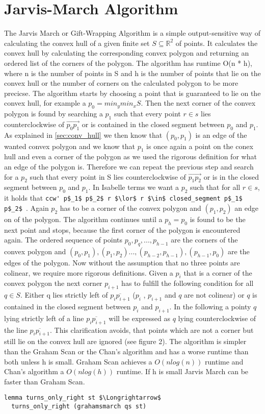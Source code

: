 \section{Jarvis-March Algorithm}
The Jarvis March or Gift-Wrapping Algorithm is a simple output-sensitive way of calculating
the convex hull of a given finite set $S \subseteq \mathbb{R}^2$ of points. It calculates the
convex hull by calculating the corresponding convex polygon and returning
an ordered list of the corners of the polygon. The algorithm has runtime O(n * h), where n 
is the number of points in S and h is the number of points that lie on the convex hull or
the number of corners on the calculated polygon to be more precicse. 
The algorithm starts by choosing a point that is guaranteed to lie on the convex hull, 
for example a $p_0 = min_y min_x S$. Then the next corner of the convex polygon
is found by searching a $p_1$ such that every point $r \in s$ lies counterclockwise
of $\vec{p_0 p_1}$ or is contained in the closed segment between $p_0$ and $p_1$. 
As explained in \ref{sec:conv_hull} we then know that $(p_0,p_1)$ is 
an edge of the wanted convex polygon and we know that $p_1$ is once again a point on
the conex hull and even a corner of the polygon as we used the rigorous definition for
what an edge of the polygon is. Therefore we can repeat the previous step
and search for a $p_2$ such that every point in S lies counterclockwise of $\vec{p_1 p_2}$
or is in the closed segment between $p_0$ and $p_1$. In Isabelle terms we want a $p_2$
such that for all $r \in s$, it holds that 
\lstinline|ccw' p$_1$ p$_2$ r $\lor$ r $\in$ closed_segment p$_1$ p$_2$ |.
Again $p_2$ has to be a corner of the convex polygon and $(p_1,p_2)$ an edge on of the
polygon. The algorithm continues until a $p_h = p_0$ is found to be the next point and
stops, because the first corner of the polygon is encountered again. 
The ordered sequence of points $p_0,p_q, ... , p_{h-1}$ are the corners of the convex polygon 
and $(p_0,p_1),(p_1,p_2) ... ,(p_{h-2},p_{h-1}), (p_{h-1},p_0)$ are the edges of the polygon.
Now without the assumption that no three points are colinear, we require more rigorous definitions.
Given a $p_i$ that is a corner of the convex polygon the next corner $p_{i+1}$ 
has to fulfill the following condition for all $q \in S$.
Either q lies strictly left of $\overline{p_i p_{i+1}}$ ($p_i$
, $p_{i+1}$ and $q$ are not colinear) or $q$ is contained in the closed
segment between $p_i$ and $p_{i+1}$. In the following  a pointy $q$ lying strictly
left of a line $\overline{p_i p_{i+1}}$ will be expressed as $q$ lying
counterclockwise of the line $\overline{p_i p_{i+1}}$. This clarification avoids, that
points which are not a corner but still lie on the convex hull are ignored (see figure 2).    
The algorithm is simpler than the Graham Scan or the Chan's algorithm and has a worse
runtime than both unless h is small. Graham Scan achieves a $O(n log(n))$ runtime and 
Chan's algorithm a $O(n log(h))$ runtime. If h is small Jarvis March 
can be faster than Graham Scan.
\begin{lstlisting}[language=isabelle]
  lemma turns_only_right st $\Longrightarrow$
  turns_only_right (grahamsmarch qs st)
\end{lstlisting}
  

